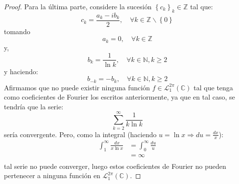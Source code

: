 \documentclass[12pt]{report}
\newcounter{it}
\theoremstyle{largebreak}
\renewcommand{\geq}{\ensuremath{\geqslant}}
\begin{document}
\begin{proof}
        Para la última parte, considere la sucesión $\left\{c_k\right\}_{k}\in\mathbb{Z}$ tal que:
        \begin{equation*}
            c_k=\frac{a_k-ib_k}{2},\quad\forall k\in\mathbb{Z}\backslash\left\{0\right\}
        \end{equation*}
        tomando
        \begin{equation*}
            a_k=0,\quad\forall k\in\mathbb{Z}
        \end{equation*}
        y,
        \begin{equation*}
            b_k=\frac{1}{\ln k},\quad\forall k\in\mathbb{N},k\geq2
        \end{equation*}
        y haciendo:
        \begin{equation*}
            b_{-k}=-b_k,\quad\forall k\in\mathbb{N},k\geq2
        \end{equation*}
        Afirmamos que no puede existir ninguna función $f\in\mathcal{L}_1^{2\pi}(\mathbb{C})$ tal que tenga como coeficientes de Fourier los escritos anteriormente, ya que en tal caso, se tendría que la serie:
        \begin{equation*}
            \sum_{ k=2}^\infty\frac{1}{k\ln k}
        \end{equation*}
        sería convergente. Pero, como la integral (haciendo $u=\ln x\Rightarrow du=\frac{dx}{x}$):
        \begin{equation*}
            \begin{split}
                \int_1^{ \infty}\frac{dx}{x\ln x}&=\int_{0}^{\infty}\frac{du}{u}\\
                &=\infty\\
            \end{split}
        \end{equation*}
        tal serie no puede converger, luego estos coeficientes de Fourier no pueden pertenecer a ninguna función en $\mathcal{L}_1^{2\pi}(\mathbb{C})$.
    \end{proof}
\end{document}
